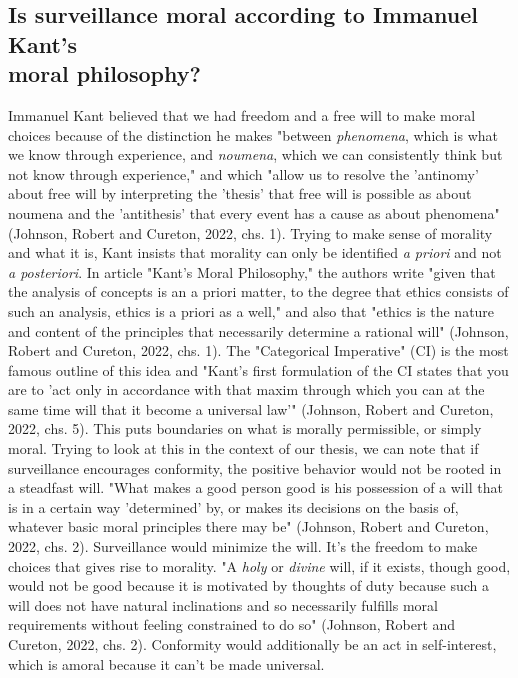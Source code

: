 \documentclass[11pt]{article}
\begin{document}
\subsection{Is surveillance moral according to Immanuel Kant's \\moral philosophy?}
Immanuel Kant believed that we had freedom and a free will to make moral choices because of the distinction he makes "between \textit{phenomena}, which is what we know through experience, and \textit{noumena}, which we can consistently think but not know through experience," and which "allow us to resolve the 'antinomy' about free will by interpreting the 'thesis' that free will is possible as about noumena and the 'antithesis' that every event has a cause as about phenomena" (Johnson, Robert and Cureton, 2022, chs. 1). Trying to make sense of morality and what it is, Kant insists that morality can only be identified \textit{a priori} and not \textit{a posteriori}. In article "Kant’s Moral Philosophy," the authors write "given that the analysis of concepts is an a priori matter, to the degree that ethics consists of such an analysis, ethics is a priori as a well," and also that "ethics is the nature and content of the principles that necessarily determine a rational will" (Johnson, Robert and Cureton, 2022, chs. 1). The "Categorical Imperative" (CI) is the most famous outline of this idea and "Kant’s first formulation of the CI states that you are to 'act only in accordance with that maxim through which you can at the same time will that it become a universal law'" (Johnson, Robert and Cureton, 2022, chs. 5). This puts boundaries on what is morally permissible, or simply moral. Trying to look at this in the context of our thesis, we can note that if surveillance encourages conformity, the positive behavior would not be rooted in a steadfast will. "What makes a good person good is his possession of a will that is in a certain way 'determined' by, or makes its decisions on the basis of, whatever basic moral principles there may be" (Johnson, Robert and Cureton, 2022, chs. 2). Surveillance would minimize the will. It's the freedom to make choices that gives rise to morality. "A \textit{holy} or \textit{divine} will, if it exists, though good, would not be good because it is motivated by thoughts of duty because such a will does not have natural inclinations and so necessarily fulfills moral requirements without feeling constrained to do so" (Johnson, Robert and Cureton, 2022, chs. 2). Conformity would additionally be an act in self-interest, which is amoral because it can't be made universal. \\ \\
\end{document}
